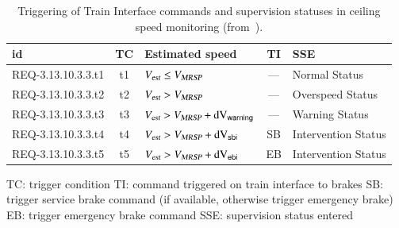 \begin{table}[htbp]
\caption{Triggering of Train Interface commands and supervision statuses in ceiling speed monitoring (from~\cite[Table~5]{ETCSSRS-Principles}).}
\begin{center}
\tabsize
\begin{tabular}{lclcl}
\hline\hline
{\bf id} & {\bf TC} & {\bf Estimated speed} & {\bf TI} & {\bf SSE} 
\\\hline
REQ-3.13.10.3.3.t1 & t1 & ${V_{\text{\sl est}}} \le {V_{\text{\sl MRSP}}}$ & --- & Normal Status
\\
REQ-3.13.10.3.3.t2 & t2 & ${V_{\text{\sl est}}} > {V_{\text{\sl MRSP}}}$ & --- & Overspeed Status
\\
REQ-3.13.10.3.3.t3 & t3 & ${V_{\text{\sl est}}} > {V_{\text{\sl MRSP}}} + \text{dV}_{\mathsf{warning}}$ & --- & Warning Status
\\
REQ-3.13.10.3.3.t4 & t4 & ${V_{\text{\sl est}}} > {V_{\text{\sl MRSP}}} + \text{dV}_{\mathsf{sbi}}$ & SB & Intervention Status
\\
REQ-3.13.10.3.3.t5 & t5 & ${V_{\text{\sl est}}} > {V_{\text{\sl MRSP}}} + \text{dV}_{\mathsf{ebi}}$ & EB & Intervention Status  
\\
\hline\hline
\end{tabular}
\end{center}

TC: trigger condition \newline
TI: command triggered on train interface to brakes \newline
SB: trigger service brake command (if available, otherwise trigger emergency brake)\newline
EB: trigger emergency brake command 
SSE: supervision status entered
\label{tab:five}
\end{table}%

 

